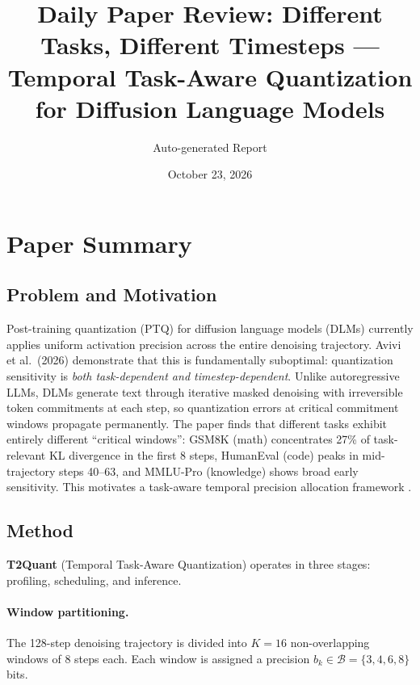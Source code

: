 \documentclass[11pt,a4paper]{article}
\title{Daily Paper Review: Different Tasks, Different Timesteps ---\\Temporal Task-Aware Quantization for Diffusion Language Models}
\author{Auto-generated Report}
\date{October 23, 2026}
\begin{document}
\maketitle

\section{Paper Summary}

\subsection{Problem and Motivation}
Post-training quantization (PTQ) for diffusion language models (DLMs) currently applies uniform activation precision across the entire denoising trajectory. Avivi et al.\ (2026) demonstrate that this is fundamentally suboptimal: quantization sensitivity is \emph{both task-dependent and timestep-dependent}. Unlike autoregressive LLMs, DLMs generate text through iterative masked denoising with irreversible token commitments at each step, so quantization errors at critical commitment windows propagate permanently. The paper finds that different tasks exhibit entirely different ``critical windows'': GSM8K (math) concentrates 27\% of task-relevant KL divergence in the first 8 steps, HumanEval (code) peaks in mid-trajectory steps 40--63, and MMLU-Pro (knowledge) shows broad early sensitivity. This motivates a task-aware temporal precision allocation framework \cite{avivi2026t2quant}.

\subsection{Method}
\textbf{T2Quant} (Temporal Task-Aware Quantization) operates in three stages: profiling, scheduling, and inference.

\paragraph{Window partitioning.} The 128-step denoising trajectory is divided into $K = 16$ non-overlapping windows of 8 steps each. Each window is assigned a precision $b_k \in \mathcal{B} = \{3, 4, 6, 8\}$ bits.
\end{document}
